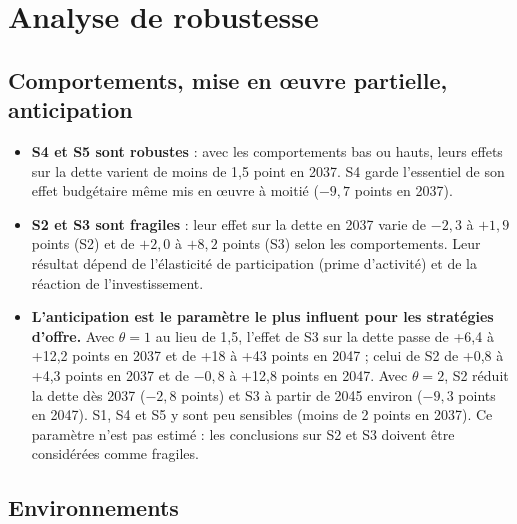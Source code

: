\chapter{Analyse de robustesse}\label{ch:robustesse}

\section{Comportements, mise en œuvre partielle, anticipation}

\begin{table}[htbp]\centering\scriptsize
\caption{Dette (points de PIB) / chômage (points) en 2037, selon le niveau des comportements et avec une mise en œuvre
à moitié.}\label{tab:robcomp}
\end{table}

\begin{itemize}
\item \textbf{S4 et S5 sont robustes} : avec les comportements bas ou hauts, leurs effets sur la dette varient de moins
de 1,5 point en 2037. S4 garde l'essentiel de son effet budgétaire même mis en œuvre à moitié ($-9{,}7$ points en 2037).
\item \textbf{S2 et S3 sont fragiles} : leur effet sur la dette en 2037 varie de $-2{,}3$ à $+1{,}9$ points (S2) et de
$+2{,}0$ à $+8{,}2$ points (S3) selon les comportements. Leur résultat dépend de l'élasticité de participation (prime
d'activité) et de la réaction de l'investissement.
\item \textbf{L'anticipation est le paramètre le plus influent pour les stratégies d'offre.} Avec $\theta = 1$ au lieu
de 1,5, l'effet de S3 sur la dette passe de +6,4 à +12,2 points en 2037 et de +18 à +43 points en 2047 ; celui de S2
de +0,8 à +4,3 points en 2037 et de $-0{,}8$ à +12,8 points en 2047. Avec $\theta = 2$, S2 réduit la dette dès 2037
($-2{,}8$ points) et S3 à partir de 2045 environ ($-9{,}3$ points en 2047). S1, S4 et S5 y sont peu sensibles (moins de
2 points en 2037). Ce paramètre n'est pas estimé : les conclusions sur S2 et S3 doivent être considérées comme fragiles.
\end{itemize}

\section{Environnements}


